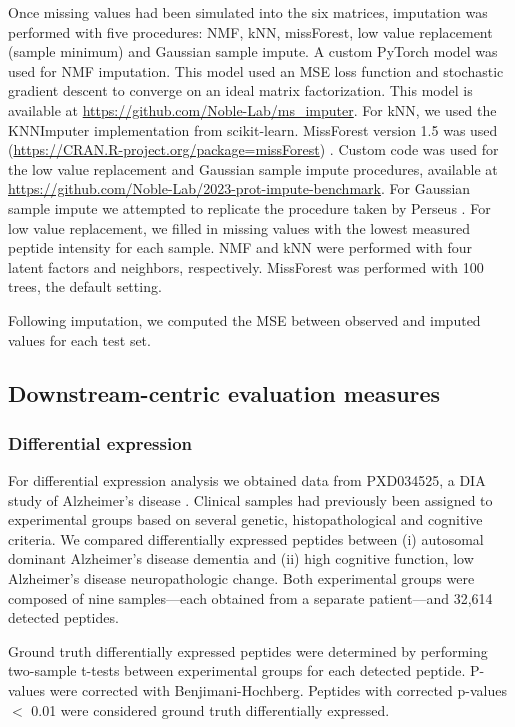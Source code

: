 \documentclass{article}
\begin{document}
Once missing values had been simulated into the six matrices, imputation was performed with five procedures: NMF, kNN, missForest, low value replacement (sample minimum) and Gaussian sample impute. A custom PyTorch model was used for NMF imputation. This model used an MSE loss function and stochastic gradient descent to converge on an ideal matrix factorization. This model is available at \url{https://github.com/Noble-Lab/ms_imputer}. For kNN, we used the KNNImputer implementation from scikit-learn. MissForest version 1.5 was used (\url{https://CRAN.R-project.org/package=missForest}) \cite{missForest}. Custom code was used for the low value replacement and Gaussian sample impute procedures, available at \url{https://github.com/Noble-Lab/2023-prot-impute-benchmark}. For Gaussian sample impute we attempted to replicate the procedure taken by Perseus \cite{Perseus}. For low value replacement, we filled in missing values with the lowest measured peptide intensity for each sample. NMF and kNN were performed with four latent factors and neighbors, respectively. MissForest was performed with 100 trees, the default setting.

Following imputation, we computed the MSE between observed and imputed values for each test set.

\subsection{Downstream-centric evaluation measures}

\subsubsection{Differential expression}

For differential expression analysis we obtained data from PXD034525, a DIA study of Alzheimer's disease \cite{smtg-maccoss}. Clinical samples had previously been assigned to experimental groups based on several genetic, histopathological and cognitive criteria. We compared differentially expressed peptides between (i) autosomal dominant Alzheimer's disease dementia and (ii) high cognitive function, low Alzheimer's disease neuropathologic change. Both experimental groups were composed of nine samples---each obtained from a separate patient---and 32,614 detected peptides. 

Ground truth differentially expressed peptides were determined by performing two-sample t-tests between experimental groups for each detected peptide. P-values were corrected with Benjimani-Hochberg. Peptides with corrected p-values $<$ 0.01 were considered ground truth differentially expressed.
\end{document}
